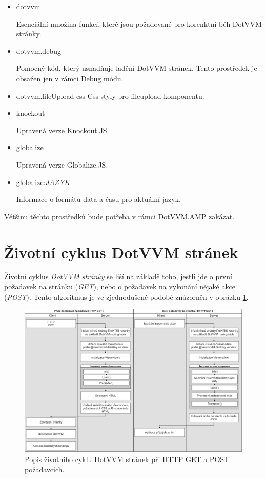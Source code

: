 \begin{itemize}
    \item dotvvm
    
    Esenciální množina funkcí, které jsou požadované pro korenktní běh DotVVM stránky.
    \item dotvvm.debug
    
    Pomocný kód, který usnadňuje ladění DotVVM stránek. Tento prostředek je obsažen jen v rámci Debug módu.
    
    \item dotvvm.fileUpload-css
    Css styly pro fileupload komponentu.
    
    \item knockout
    
    Upravená verze Knockout.JS.
    \item globalize
    
    Upravená verze Globalize.JS.
    \item globalize:\textit{JAZYK}
    
    Informace o formátu data a času pro aktuální jazyk.
\end{itemize}
Většinu těchto prostředků bude potřeba v rámci DotVVM.AMP zakázat.
\section{Životní cyklus DotVVM stránek}
\label{lifecycle}
Životní cyklus \emph{DotVVM stránky} se liší na základě toho, jestli jde o první požadavek na stránku (\emph{GET}), nebo o požadavek na vykonání nějaké akce (\emph{POST})\cite{DotVVM-VM}. Tento algoritmus je ve zjednodušené podobě znázorněn v obrázku \ref{Get a Post v DotVVM}.
\begin{figure}[hbt]
	\centering
	\includegraphics[width=1\textwidth]{obrazky-figures/DotVVM_lifecycle.png}\hfill
	\caption{Popis životního cyklu DotVVM stránek při HTTP GET a POST požadavcích.}
	\label{Get a Post v DotVVM}
\end{figure}

